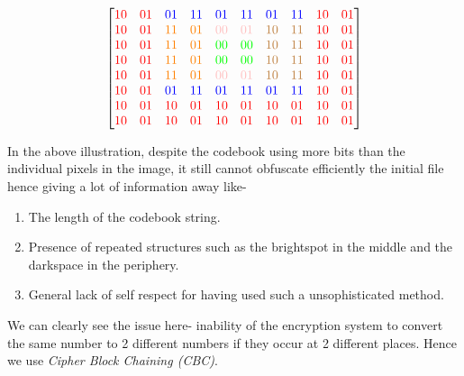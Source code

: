 \[\begin{bmatrix}
					\color{red}10 & \color{red}01 & \color{blue}01 & \color{blue}11 & \color{blue}01 & \color{blue}11 & \color{blue}01 & \color{blue}11 & \color{red}10 & \color{red}01\\
					\color{red}10 & \color{red}01 & \color{orange}11 & \color{orange}01 & \color{pink}00 & \color{pink}01 & \color{brown}10 & \color{brown}11 & \color{red}10 & \color{red}01\\
					\color{red}10 & \color{red}01 & \color{orange}11 & \color{orange}01 & \color{green}00 & \color{green}00 & \color{brown}10 & \color{brown}11 & \color{red}10 & \color{red}01\\
					\color{red}10 & \color{red}01 & \color{orange}11 & \color{orange}01 & \color{green}00 & \color{green}00 & \color{brown}10 & \color{brown}11 & \color{red}10 & \color{red}01\\
					\color{red}10 & \color{red}01 & \color{orange}11 & \color{orange}01 & \color{pink}00 & \color{pink}01 & \color{brown}10 & \color{brown}11 & \color{red}10 & \color{red}01\\
					\color{red}10 & \color{red}01 & \color{blue}01 & \color{blue}11 & \color{blue}01 & \color{blue}11 & \color{blue}01 & \color{blue}11 & \color{red}10 & \color{red}01\\
					\color{red}10 & \color{red}01 & \color{red}10 & \color{red}01 & \color{red}10 & \color{red}01 & \color{red}10 & \color{red}01 & \color{red}10 & \color{red}01\\
					\color{red}10 & \color{red}01 & \color{red}10 & \color{red}01 & \color{red}10 & \color{red}01 & \color{red}10 & \color{red}01 & \color{red}10 & \color{red}01\\
				\end{bmatrix}
			\]
			\raggedright In the above illustration, despite the codebook using more bits than the individual pixels in the image, it still cannot obfuscate efficiently the initial file hence giving a lot of information away like-
			\begin{enumerate}
				\item The length of the codebook string.
				\item Presence of repeated structures such as the brightspot in the middle and the darkspace in the periphery.
				\item General lack of self respect for having used such a unsophisticated method.
			\end{enumerate}

			We can clearly see the issue here- inability of the encryption system to convert the same number to 2 different numbers if they occur at 2 different places. Hence we use \emph{Cipher Block Chaining (CBC)}.

